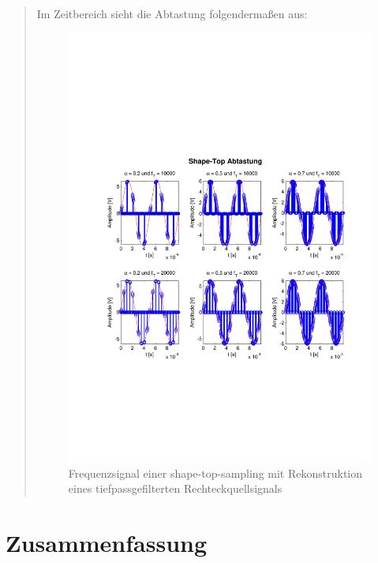 \begin{quote}
    	Im Zeitbereich sieht die Abtastung folgendermaßen aus:
    	
    	\begin{figure}[H]
    \centering
        \includegraphics[scale=0.7, trim = 0cm 0cm 0cm 0cm,
        clip]{./Bilder/shape-top-zeit_3V}
            \caption{Frequenzsignal einer shape-top-sampling mit Rekonstruktion
            eines tiefpassgefilterten Rechteckquellsignals}
  	    \end{figure}
    	
       	
    \end{quote}%
    
    \section{Zusammenfassung}
    \begin{quote}
    \end{quote}%
         

